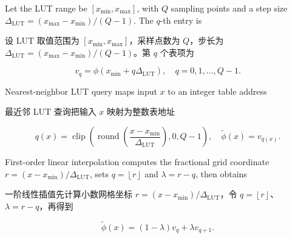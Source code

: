 \documentclass[sn-nature]{sn-jnl}
\newif\ifCNENEnglish
\newif\ifCNENBilingual
\newcommand{\CNEN}[2]{%
    \ifCNENBilingual
        #1%
        \if\relax\detokenize{#2}\relax\else\par #2\fi%
    \else
        \ifCNENEnglish
            #2%
        \else
            #1%
        \fi
    \fi
}
\begin{document}
\CNEN{设 LUT 取值范围为 $[x_{\min},x_{\max}]$，采样点数为 $Q$，步长为 $\Delta_{\mathrm{LUT}}=(x_{\max}-x_{\min})/(Q-1)$。第 $q$ 个表项为}{Let the LUT range be $[x_{\min}, x_{\max}]$, with $Q$ sampling points and a step size $\Delta_{\text{LUT}} = (x_{\max} - x_{\min}) / (Q - 1)$. The $q$-th entry is%
}\begin{equation}
    v_q = \phi\left(x_{\min}+q\Delta_{\mathrm{LUT}}\right), \quad q=0,1,\dots,Q-1.    \label{eq:lut_grid}
\end{equation}
\CNEN{最近邻 LUT 查询把输入 $x$ 映射为整数表地址}{
Nearest-neighbor LUT query maps input $x$ to an integer table address
}
\begin{equation}
    q(x)=\operatorname{clip}\left(\operatorname{round}\left(\frac{x-x_{\min}}{
\Delta_{\mathrm{LUT}}}\right),0,Q-1\right), \quad \tilde{\phi}(x)=v_{q(x)}.   
 \label{eq:lut_nearest}\end{equation}
\CNEN{一阶线性插值先计算小数网格坐标 $r=(x-x_{\min})/\Delta_{\mathrm{LUT}}$，令 $q=\left\lfloor r\right\rfloor$、$\lambda=r-q$，再得到}{
First-order linear interpolation computes the fractional grid coordinate $r=(x-x_{\min})/\Delta_{\mathrm{LUT}}$, sets $q=\left\lfloor r\right\rfloor$ and $\lambda=r-q$, then obtains%
}\begin{equation}
    \tilde{\phi}(x)=(1-\lambda)v_q+\lambda v_{q+1}.
    \label{eq:lut_interp}
\end{equation}
\end{document}

